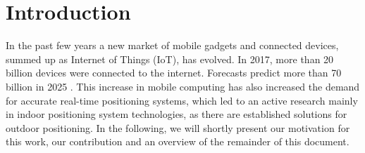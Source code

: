 
\chapter{Introduction} %

\label{Chapter1} %

In the past few years a new market of mobile gadgets and connected devices, summed up as Internet of Things (IoT), has evolved. In 2017, more than 20 billion devices were connected to the internet. Forecasts predict more than 70 billion in 2025 \cite{Statista}. This increase in mobile computing has also increased the demand for accurate real-time positioning systems, which led to an active research mainly in indoor positioning system technologies, as there are established solutions for outdoor positioning.
In the following, we will shortly present our motivation for this work, our contribution and an overview of the remainder of this document.



